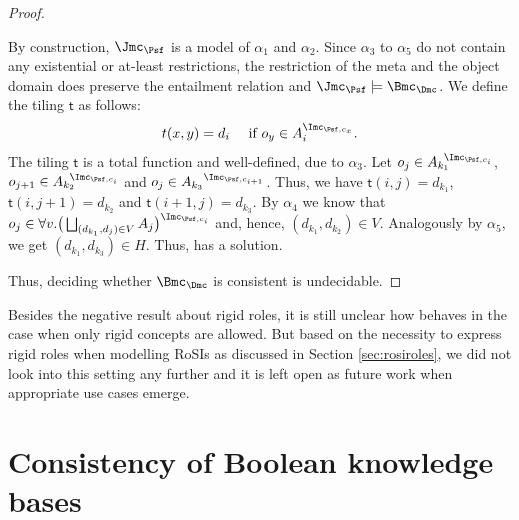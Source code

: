 \begin{proof}
\begin{claimproof}
    By construction, $\J_{\Psf}$ is a model of $\alpha_{1}$ and $\alpha_{2}$. Since $\alpha_{3}$ to
    $\alpha_{5}$ do not contain any existential or at-least restrictions, the restriction of the
    meta and the object domain does preserve the entailment relation and
    $\J_{\Psf}\models\Bmc_{\Dmc}$. We define the tiling $\mathsf{t}$ as follows:
    \begin{align*}
      t(x,y) = d_{i} \quad\text{ if $o_{y} \in A_{i}^{\I_{\Psf,c_{x}}}$}.
    \end{align*}
    The tiling $\mathsf{t}$ is a total function and well-defined, due to $\alpha_{3}$. Let
    $o_{j} \in {A_{k_{1}}}^{\!\!\!\I_{\Psf,c_{i}}}$,
    $o_{j+1} \in {A_{k_{2}}}^{\!\!\!\I_{\Psf,c_{i}}}$ and
    $o_{j} \in {A_{k_{3}}}^{\I_{\Psf,c_{i+1}}}$. Thus, we have $\mathsf{t}(i,j) = d_{k_{1}}$,
    $\mathsf{t}(i,j+1) = d_{k_{2}}$ and $\mathsf{t}(i+1,j) = d_{k_{3}}$. By $\alpha_{4}$ we know
    that
    $o_{j} \in \smash{\forall v.\big(\bigsqcup_{(d_{k_{1}},d_{j})\in V}
      A_{j}\big)^{\I_{\Psf,c_{i}}}}$ and, hence, $(d_{k_{1}}, d_{k_{2}})\in V$. Analogously by
    $\alpha_{5}$, we get $(d_{k_{1}}, d_{k_{3}})\in H$. Thus, \Dmc has a solution.
  \end{claimproof}

  Thus, deciding whether $\Bmc_{\Dmc}$ is consistent is undecidable.
\end{proof}

Besides the negative result about rigid roles, it is still unclear how \LMLOplus behaves in the case
when only rigid concepts are allowed. But based on the necessity to express rigid roles when
modelling RoSIs  as discussed in Section \ref{sec:rosiroles}, we did
not look into this setting any further and it is left open as future work when appropriate use cases
emerge.


\section{Consistency of Boolean \texorpdfstring{\SHOIQ}{SHOIQ} knowledge bases}
\label{sec:consistency-shoiq-bkb}




